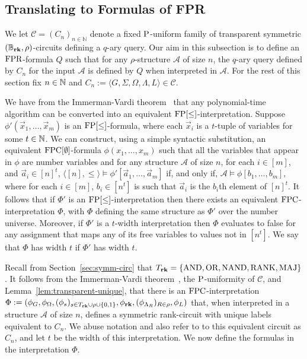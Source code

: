 \documentclass[../paper.tex]{subfiles}
\begin{document}
\subsection{Translating to Formulas of FPR}
\label{sec:translating-formulas-to-FPR}
We let $\mathcal{C} = (C_n)_{n \in \mathbb{N}}$ denote a fixed $\mathrm{P}$-uniform
family of transparent symmetric $(\mathbb{B}_{\text{\textbf{rk}}}, \rho)$-circuits defining a $q$-ary query.
Our aim in this subsection is to define an $\text{\upshape FPR}$-formula $Q$ such that for any
$\rho$-structure $\mathcal{A}$ of size $n$, the $q$-ary query defined by $C_n$
for the input $\mathcal{A}$ is defined by $Q$ when interpreted in $\mathcal{A}$.
For the rest of this section fix $n \in \mathbb{N}$ and $C_n := \langle G, \Sigma,
\Omega, \Lambda, L \rangle \in \mathcal{C}$.

We have from the Immerman-Vardi theorem~\cite{Immerman198686, Vardi:1982} that
any polynomial-time algorithm can be converted into an equivalent
$\text{\upshape FP}[\leq]$-interpretation. Suppose $\phi'(\vec{x}_1, \ldots , \vec{x}_m)$ is an
$\text{\upshape FP}[\leq]$-formula, where each $\vec{x}_i$ is a $t$-tuple of variables for some
$t \in \mathbb{N}$. We can construct, using a simple syntactic substitution, an
equivalent $\text{\upshape FPC}[\emptyset]$-formula $\phi(x_1, \ldots , x_m)$ such that all the
variables that appear in $\phi$ are number variables and for any structure
$\mathcal{A}$ of size $n$, for each $i \in [m]$, and $\vec{a}_i \in [n]^{t}$,
$\langle [n], \leq \rangle \models \phi'[\vec{a}_1 , \ldots, \vec{a}_m]$ if, and
only if, $\mathcal{A} \models \phi[b_1, \ldots, b_m]$, where for each $i \in
[m]$, $b_i \in [n^t]$ is such that $\vec{a}_i$ is the $b_i$th element of
$[n]^t$. It follows that if $\Phi'$ is an $\text{\upshape FP}[\leq]$-interpretation then there
exists an equivalent $\text{\upshape FPC}$-interpretation $\Phi$, with $\Phi$ defining the same
structure as $\Phi'$ over the number universe. Moreover, if $\Phi'$ is a
$t$-width interpretation then $\Phi$ evaluates to false for any assignment that
maps any of its free variables to values not in $[n^t]$. We say that $\Phi$ has
width $t$ if $\Phi'$ has width $t$.

Recall from Section~\ref{sec:symm-circ} that $T_{\text{\textbf{rk}}} = \{\text{\upshape AND}, \text{\upshape OR}, \text{\upshape NAND},
\text{\upshape RANK}, \text{\upshape MAJ}\}$. It follows from the Immerman-Vardi theorem~\cite{Immerman198686,
  Vardi:1982}, the $\mathrm{P}$-uniformity of $\mathcal{C}$, and
Lemma~\ref{lem:transparent-unique}, that there is an $\text{\upshape FPC}$-interpretation $\Phi
:= (\phi_G, \phi_\Omega, (\phi_s)_{ s \in T_{\text{\textbf{rk}}} \cup \rho \cup \{0,1\}},
\phi_{\text{\textbf{rk}}}, (\phi_{\Lambda_R})_{R \in \rho}, \phi_L)$ that, when interpreted
in a structure $\mathcal{A}$ of size $n$, defines a symmetric rank-circuit with
unique labels equivalent to $C_n$. We abuse notation and also refer to to this
equivalent circuit as $C_n$, and let $t$ be the width of this interpretation. We
now define the formulas in the interpretation $\Phi$.
\end{document}
